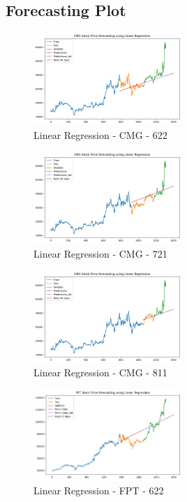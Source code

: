 \documentclass{ieeeojies}
\begin{document}
\subsection{Forecasting Plot}
\begin{figure} [H]
    \centering
    \includegraphics[width=0.5\textwidth]{bibliography/Figure/LinearRegression_CMG_622_90.png}
    \caption{Linear Regression - CMG - 622}
    \label{fig:LR_CMG_622_90}
\end{figure}
\begin{figure} [H]
    \centering
    \includegraphics[width=0.5\textwidth]{bibliography/Figure/LinearRegression_CMG_721_90.png}
    \caption{Linear Regression - CMG - 721}
    \label{fig:LR_CMG_721_90}
\end{figure}
\begin{figure} [H]
    \centering
    \includegraphics[width=0.5\textwidth]{bibliography/Figure/LinearRegression_CMG_811_90.png}
    \caption{Linear Regression - CMG - 811}
    \label{fig:LR_CMG_811_90}
\end{figure}
\begin{figure} [H]
    \centering
    \includegraphics[width=0.5\textwidth]{bibliography/Figure/LinearRegression_FPT_622_90.png}
    \caption{Linear Regression - FPT - 622}
    \label{fig:LR_FPT_622_90}
\end{figure}
\end{document}
